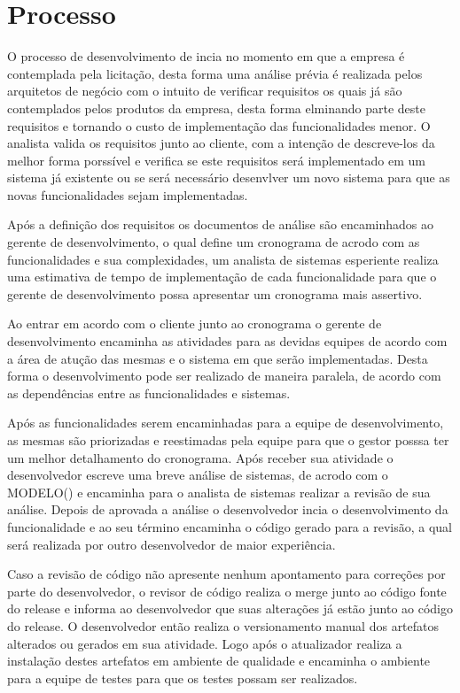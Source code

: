 \documentclass[	DIV=calc,%
							paper=a4,%
							fontsize=12pt,%
							onecolumn]{scrartcl}	 					%
\begin{document}
\section{Processo}

O processo de desenvolvimento de incia no momento em que a empresa é contemplada pela licitação, desta forma uma análise prévia é realizada pelos arquitetos
de negócio com o intuito de verificar requisitos os quais já são contemplados pelos produtos da empresa, desta forma elminando parte deste requisitos e tornando o
custo de implementação das funcionalidades menor. O analista valida os requisitos junto ao cliente, com a intenção de descreve-los da melhor forma porssível e verifica
se este requisitos será implementado em um sistema já existente ou se será necessário desenvlver um novo sistema para que as novas funcionalidades sejam implementadas.

Após a definição dos requisitos os documentos de análise são encaminhados ao gerente de desenvolvimento, o qual define um cronograma de acrodo com as funcionalidades e
sua complexidades, um analista de sistemas esperiente realiza uma estimativa de tempo de implementação de cada funcionalidade para que o gerente de desenvolvimento possa
apresentar um cronograma mais assertivo.

Ao entrar em acordo com o cliente junto ao cronograma o gerente de desenvolvimento encaminha as atividades para as devidas equipes de acordo com a área de atução das mesmas
e o sistema em que serão implementadas. Desta forma o desenvolvimento pode ser realizado de maneira paralela, de acordo com as dependências entre as funcionalidades e sistemas.

Após as funcionalidades serem encaminhadas para a equipe de desenvolvimento, as mesmas são priorizadas e reestimadas pela equipe para que o gestor posssa ter um melhor
detalhamento do cronograma. Após receber sua atividade o desenvolvedor escreve uma breve análise de sistemas, de acrodo com o MODELO() e encaminha para o analista de sistemas
realizar a revisão de sua análise. Depois de aprovada a análise o desenvolvedor incia o desenvolvimento da funcionalidade e ao seu término encaminha o código gerado para
a revisão, a qual será realizada por outro desenvolvedor de maior experiência.

Caso a revisão de código não apresente nenhum apontamento para correções por parte do desenvolvedor, o revisor de código realiza o merge junto ao código fonte do release
e informa ao desenvolvedor que suas alterações já estão junto ao código do release. O desenvolvedor então realiza o versionamento manual dos artefatos alterados ou gerados
em sua atividade. Logo após o atualizador realiza a instalação destes artefatos em ambiente de qualidade e encaminha o ambiente para a equipe de testes para que os testes
possam ser realizados.
\end{document}
